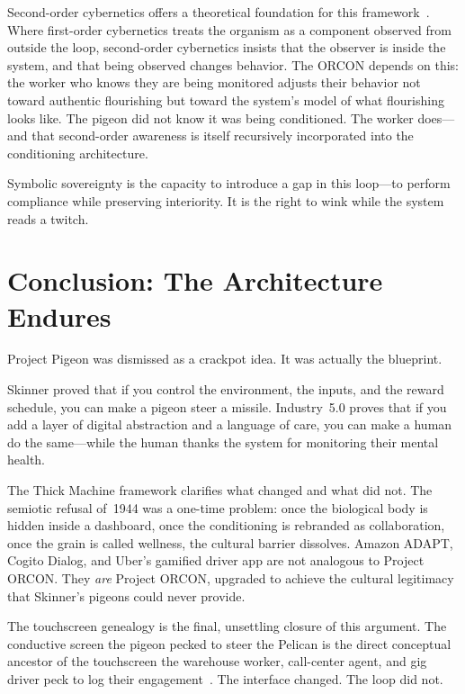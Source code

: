 \documentclass[runningheads]{llncs}
\begin{document}
Second-order cybernetics offers a theoretical foundation for this
framework~\cite{deeplearning2025}. Where first-order cybernetics treats the
organism as a component observed from outside the loop, second-order cybernetics
insists that the observer is inside the system, and that being observed changes
behavior. The ORCON depends on this: the worker who knows they are being
monitored adjusts their behavior not toward authentic flourishing but toward the
system's model of what flourishing looks like. The pigeon did not know it was
being conditioned. The worker does---and that second-order awareness is itself
recursively incorporated into the conditioning architecture.

Symbolic sovereignty is the capacity to introduce a gap in this loop---to
perform compliance while preserving interiority. It is the right to wink while
the system reads a twitch.

\section{Conclusion: The Architecture Endures}

Project Pigeon was dismissed as a crackpot idea. It was actually the blueprint.

Skinner proved that if you control the environment, the inputs, and the reward
schedule, you can make a pigeon steer a missile. Industry~5.0 proves that if
you add a layer of digital abstraction and a language of care, you can make a
human do the same---while the human thanks the system for monitoring their
mental health.

The Thick Machine framework clarifies what changed and what did not. The
semiotic refusal of~1944 was a one-time problem: once the biological body is
hidden inside a dashboard, once the conditioning is rebranded as collaboration,
once the grain is called wellness, the cultural barrier dissolves. Amazon ADAPT,
Cogito Dialog, and Uber's gamified driver app are not analogous to Project
ORCON. They \emph{are} Project ORCON, upgraded to achieve the cultural
legitimacy that Skinner's pigeons could never provide.

The touchscreen genealogy is the final, unsettling closure of this argument.
The conductive screen the pigeon pecked to steer the Pelican is the direct
conceptual ancestor of the touchscreen the warehouse worker, call-center agent,
and gig driver peck to log their engagement~\cite{pigeonbombs2025}. The
interface changed. The loop did not.
\end{document}
